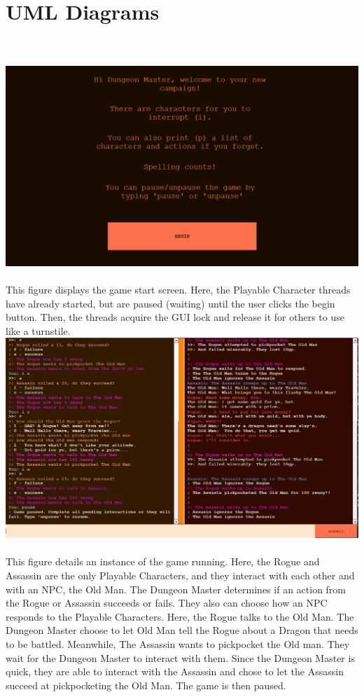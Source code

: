 \documentclass{article}
\theoremstyle{definition}
\begin{document}
\section*{UML Diagrams} \\  \\
\includegraphics[width = 6in]{"begin_game"}\\ \\
This figure displays the game start screen. Here, the Playable Character threads
have already started, but are paused (waiting) until the user clicks the begin
button. Then, the threads acquire the GUI lock and release it for others to use
like a turnstile. \\
\includegraphics[width = 6.5in]{"in_game"} 
\\ \\
This figure details an instance of the game running. Here, the Rogue and Assassin
are the only Playable Characters, and they interact with each other and with 
an NPC, the Old Man. The Dungeon Master determines if an action from the Rogue
or Assassin succeeds or fails. They also can choose how an NPC responds to the
Playable Characters. Here, the Rogue talks to the Old Man. The Dungeon Master
choose to let Old Man tell the Rogue about a Dragon that needs to be battled.
Meanwhile, The Assassin wants to pickpocket the Old man. They wait for the 
Dungeon Master to interact with them. Since the Dungeon Master is quick, they
are able to interact with the Assassin and chose to let the Assassin succeed
at pickpocketing the Old Man. The game is then paused.
\end{document}
